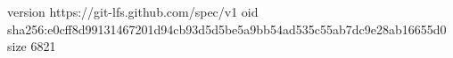 version https://git-lfs.github.com/spec/v1
oid sha256:e0cff8d99131467201d94cb93d5d5be5a9bb54ad535c55ab7dc9e28ab16655d0
size 6821
